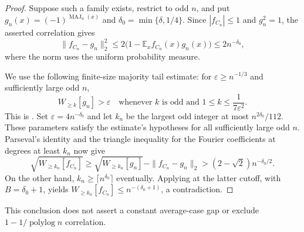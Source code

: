 \begin{proof}
Suppose such a family exists, restrict to odd $n$, and put
$g_n(x)=(-1)^{\operatorname{MAJ}_n(x)}$ and
$\delta_0=\min\{\delta,1/4\}$. Since $|f_{C_n}|\le1$ and $g_n^2=1$,
the asserted correlation gives
\[
 \|f_{C_n}-g_n\|_2^2
 \le 2\bigl(1-\mathbb E_x f_{C_n}(x)g_n(x)\bigr)
 \le 2n^{-\delta_0},
\]
where the norm uses the uniform probability measure.

We use the following finite-size majority tail estimate:
for $\varepsilon\ge n^{-1/3}$ and sufficiently large odd $n$,
\[
 W_{\ge k}[g_n]>\varepsilon
 \quad\text{whenever $k$ is odd and }1\le k\le\frac1{7\varepsilon^2}.
\]
This is \cite[Theorem~3.5.6, p.~50]{ODonnell2003Noise}.
Set $\varepsilon=4n^{-\delta_0}$ and let $k_n$ be the largest odd
integer at most $n^{2\delta_0}/112$. These parameters satisfy the
estimate's hypotheses for all sufficiently large odd $n$.
Parseval's identity and the triangle inequality for the Fourier
coefficients at degrees at least $k_n$ now give
\[
 \sqrt{W_{\ge k_n}[f_{C_n}]}
 \ge \sqrt{W_{\ge k_n}[g_n]}-\|f_{C_n}-g_n\|_2
 > (2-\sqrt2)n^{-\delta_0/2}.
\]
On the other hand, $k_n\ge\lceil n^{\delta_0}\rceil$ eventually.
Applying  at the latter cutoff, with
$B=\delta_0+1$, yields
$W_{\ge k_n}[f_{C_n}]\le n^{-(\delta_0+1)}$, a contradiction.
\end{proof}

This conclusion does not assert a constant average-case gap or exclude
\(1-1/\operatorname{polylog}n\) correlation.
